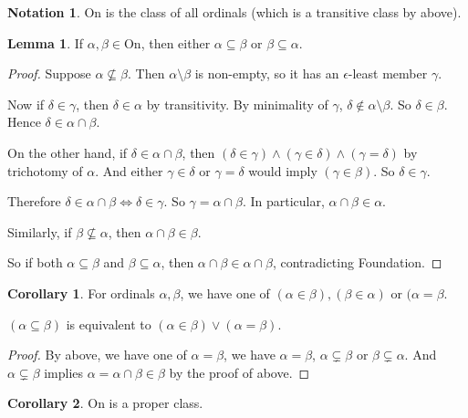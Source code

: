 \documentclass[a4paper]{article}
\theoremstyle{definition}
\newtheorem*{lemma}{Lemma}
\newtheorem*{notation}{Notation}
\newtheorem*{cor}{Corollary}
\newcommand{\On}{\mathrm{On}}
\begin{document}
\begin{notation}
  $\On$ is the class of all ordinals (which is a transitive class by above).
\end{notation}

\begin{lemma}
  If $\alpha, \beta\in \On$, then either $\alpha\subseteq \beta$ or $\beta\subseteq \alpha$.
\end{lemma}

\begin{proof}
  Suppose $\alpha\not\subseteq \beta$. Then $\alpha\setminus \beta$ is non-empty, so it has an $\epsilon$-least member $\gamma$.

Now if $\delta \in \gamma$, then $\delta\in \alpha$ by transitivity. By minimality of $\gamma$, $\delta\not\in \alpha\setminus \beta$. So $\delta\in \beta$. Hence $\delta \in \alpha\cap \beta$. 

On the other hand, if $\delta\in \alpha\cap \beta$, then $(\delta\in \gamma)\wedge (\gamma\in \delta)\wedge (\gamma = \delta)$ by trichotomy of $\alpha$. And either $\gamma\in \delta$ or $\gamma = \delta$ would imply $(\gamma\in \beta)$. So $\delta \in \gamma$.

Therefore $\delta\in\alpha\cap \beta\Leftrightarrow \delta\in \gamma$. So $\gamma = \alpha\cap \beta$. In particular, $\alpha\cap\beta\in \alpha$. 

Similarly, if $\beta\not\subseteq \alpha$, then $\alpha\cap\beta\in \beta$.

So if both $\alpha\subseteq \beta$ and $\beta \subseteq \alpha$, then $\alpha\cap \beta\in \alpha\cap \beta$, contradicting Foundation.
\end{proof}

\begin{cor}
  For ordinals $\alpha, \beta$, we have one of $(\alpha\in \beta), (\beta\in \alpha)$ or $(\alpha = \beta$.

  $(\alpha\subseteq \beta)$ is equivalent to $(\alpha\in\beta)\vee (\alpha = \beta)$.
\end{cor}

\begin{proof}
  By above, we have one of $\alpha = \beta$, we have $\alpha = \beta$, $\alpha\subsetneq \beta$ or $\beta\subsetneq \alpha$. And $\alpha\subsetneq \beta$ implies $\alpha = \alpha\cap\beta\in \beta$ by the proof of above.
\end{proof}

\begin{cor}
  $\On$ is a proper class.
\end{cor}
\end{document}
